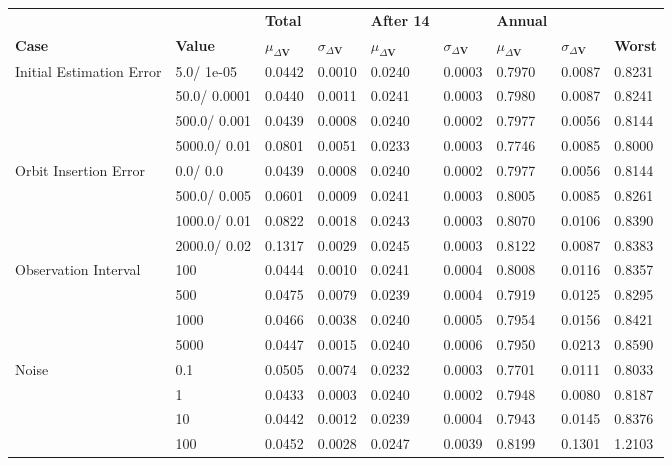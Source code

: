 \begin{table}[h!]
\centering
\begin{tabular}{lllllllll}
 &  & \cellcolor[HTML]{EFEFEF}\textbf{Total} &  & \cellcolor[HTML]{EFEFEF}\textbf{After 14} & & \cellcolor[HTML]{EFEFEF}\textbf{Annual} & &\\
\rowcolor[HTML]{EFEFEF} 
\textbf{Case} & \textbf{Value} & \textbf{$\mu_{\Delta \boldsymbol{V}}$} & \textbf{$\sigma_{\Delta \boldsymbol{V}}$} & \textbf{$\mu_{\Delta \boldsymbol{V}}$} & \textbf{$\sigma_{\Delta \boldsymbol{V}}$} & \textbf{$\mu_{\Delta \boldsymbol{V}}$} & \textbf{$\sigma_{\Delta \boldsymbol{V}}$} & \textbf{Worst} \\ 
Initial Estimation Error & 5.0/
1e-05 & 0.0442 & 0.0010 & 0.0240 & 0.0003 & 0.7970 & 0.0087 & 0.8231 \\ 
 & 50.0/
0.0001 & 0.0440 & 0.0011 & 0.0241 & 0.0003 & 0.7980 & 0.0087 & 0.8241 \\ 
 & 500.0/
0.001 & 0.0439 & 0.0008 & 0.0240 & 0.0002 & 0.7977 & 0.0056 & 0.8144 \\ 
 & 5000.0/
0.01 & 0.0801 & 0.0051 & 0.0233 & 0.0003 & 0.7746 & 0.0085 & 0.8000 \\ 
Orbit Insertion Error & 0.0/
0.0 & 0.0439 & 0.0008 & 0.0240 & 0.0002 & 0.7977 & 0.0056 & 0.8144 \\ 
 & 500.0/
0.005 & 0.0601 & 0.0009 & 0.0241 & 0.0003 & 0.8005 & 0.0085 & 0.8261 \\ 
 & 1000.0/
0.01 & 0.0822 & 0.0018 & 0.0243 & 0.0003 & 0.8070 & 0.0106 & 0.8390 \\ 
 & 2000.0/
0.02 & 0.1317 & 0.0029 & 0.0245 & 0.0003 & 0.8122 & 0.0087 & 0.8383 \\ 
Observation Interval & 100 & 0.0444 & 0.0010 & 0.0241 & 0.0004 & 0.8008 & 0.0116 & 0.8357 \\ 
 & 500 & 0.0475 & 0.0079 & 0.0239 & 0.0004 & 0.7919 & 0.0125 & 0.8295 \\ 
 & 1000 & 0.0466 & 0.0038 & 0.0240 & 0.0005 & 0.7954 & 0.0156 & 0.8421 \\ 
 & 5000 & 0.0447 & 0.0015 & 0.0240 & 0.0006 & 0.7950 & 0.0213 & 0.8590 \\ 
Noise & 0.1 & 0.0505 & 0.0074 & 0.0232 & 0.0003 & 0.7701 & 0.0111 & 0.8033 \\ 
 & 1 & 0.0433 & 0.0003 & 0.0240 & 0.0002 & 0.7948 & 0.0080 & 0.8187 \\ 
 & 10 & 0.0442 & 0.0012 & 0.0239 & 0.0004 & 0.7943 & 0.0145 & 0.8376 \\ 
 & 100 & 0.0452 & 0.0028 & 0.0247 & 0.0039 & 0.8199 & 0.1301 & 1.2103 \\ 

\end{tabular}
\end{table}
